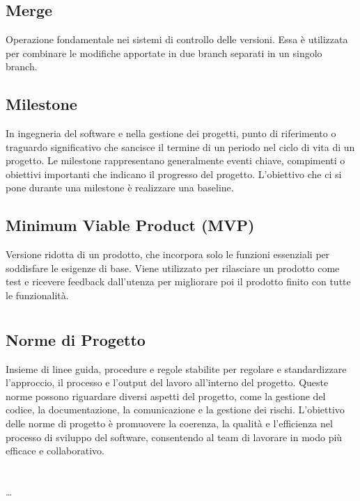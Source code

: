 
\section{}

\hypertarget{sec:merge}{}
\subsection*{Merge}
Operazione fondamentale nei sistemi di controllo delle versioni. Essa è utilizzata per combinare le modifiche apportate in due branch separati in un 
singolo branch.

\subsection*{Milestone}
In ingegneria del software e nella gestione dei progetti, punto di riferimento o traguardo significativo che sancisce il termine di un periodo nel ciclo 
di vita di un progetto. Le milestone rappresentano generalmente eventi chiave, compimenti o obiettivi importanti che indicano il progresso del progetto. 
L’obiettivo che ci si pone durante una milestone è realizzare una baseline.

\hypertarget{sec:MVP}{}
\subsection*{Minimum Viable Product (MVP)}
Versione ridotta di un prodotto, che incorpora solo le funzioni essenziali per soddisfare le esigenze di base. Viene utilizzato per rilasciare un prodotto 
come test e ricevere feedback dall’utenza per migliorare poi il prodotto finito con tutte le funzionalità.

\newpage



\section{}

\subsection*{Norme di Progetto}
Insieme di linee guida, procedure e regole stabilite per regolare e standardizzare l’approccio, il processo e l’output del lavoro all’interno del progetto. 
Queste norme possono riguardare diversi aspetti del progetto, come la gestione del codice, la documentazione, la comunicazione e la gestione dei rischi. 
L’obiettivo delle norme di progetto è promuovere la coerenza, la qualità e l’efficienza nel processo di sviluppo del software, consentendo al team di 
lavorare in modo più efficace e collaborativo.

\newpage



\section{}

\dots

\newpage